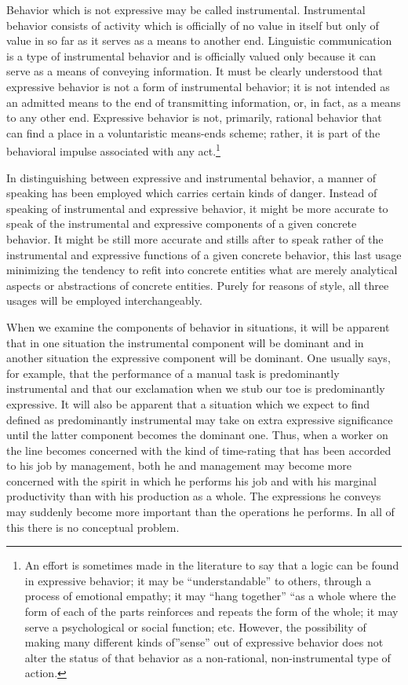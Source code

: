 \documentclass[openany,nobib]{tufte-book}
\begin{document}
Behavior which is not expressive may be called instrumental.
Instrumental behavior consists of activity which is officially of no
value in itself but only of value in so far as it serves as a means to
another end. Linguistic communication is a type of instrumental behavior
and is officially valued only because it can serve as a means of
conveying information. It must be clearly understood that expressive
behavior is not a form of instrumental behavior; it is not intended as
an admitted means to the end of transmitting information, or, in fact,
as a means to any other end. Expressive behavior is not, primarily,
rational behavior that can find a place in a voluntaristic means-ends
scheme; rather, it is part of the behavioral impulse associated with any
act.\footnote{An effort is sometimes made in the literature to say that
  a logic can be found in expressive behavior; it may be
  ``understandable'' to others, through a process of emotional empathy;
  it may ``hang together'' ``as a whole where the form of each of the
  parts reinforces and repeats the form of the whole; it may serve a
  psychological or social function; etc. However, the possibility of
  making many different kinds of''sense'' out of expressive behavior
  does not alter the status of that behavior as a non-rational,
  non-instrumental type of action.}

In distinguishing between expressive and instrumental behavior, a manner
of speaking has been employed which carries certain kinds of danger.
Instead of speaking of instrumental and expressive behavior, it might be
more accurate to speak of the instrumental and expressive components of
a given concrete behavior. It might be still more accurate and stills
after to speak rather of the instrumental and expressive functions of a
given concrete behavior, this last usage minimizing the tendency to
refit into concrete entities what are merely analytical aspects or
abstractions of concrete entities. Purely for reasons of style, all
three usages will be employed interchangeably.

When we examine the components of behavior in situations, it will be
apparent that in one situation the instrumental component will be
dominant and in another situation the expressive component will be
dominant. One usually says, for example, that the performance of a
manual task is predominantly instrumental and that our exclamation when
we stub our toe is predominantly expressive. It will also be apparent
that a situation which we expect to find defined as predominantly
instrumental may take on extra expressive significance until the latter
component becomes the dominant one. Thus, when a worker on the line
becomes concerned with the kind of time-rating that has been accorded to
his job by management, both he and management may become more concerned
with the spirit in which he performs his job and with his marginal
productivity than with his production as a whole. The expressions he
conveys may suddenly become more important than the operations he
performs. In all of this there is no conceptual problem.
\end{document}
